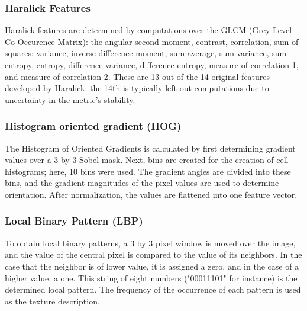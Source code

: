 
\subsubsection{Haralick Features}

Haralick features \cite{Haralick_1973} are determined by computations over the GLCM (Grey-Level Co-Occurence Matrix): the angular second moment, contrast, correlation, sum of squares: variance, inverse difference moment, sum average, sum variance, sum entropy, entropy, difference variance, difference entropy, measure of correlation 1, and measure of correlation 2. These are 13 out of the 14 original features developed by Haralick: the 14th is typically left out computations due to uncertainty in the metric's stability. 

\subsubsection{Histogram oriented gradient (HOG)}

The Histogram of Oriented Gradients is calculated by first determining gradient values over a 3 by 3 Sobel mask. Next, bins are created for the creation of cell histograms; here, 10 bins were used. The gradient angles are divided into these bins, and the gradient magnitudes of the pixel values are used to determine orientation. After normalization, the values are flattened into one feature vector. 

\subsubsection{Local Binary Pattern (LBP)}

To obtain local binary patterns, a 3 by 3 pixel window is moved over the image, and the value of the central pixel is compared to the value of its neighbors. In the case that the neighbor is of lower value, it is assigned a zero, and in the case of a higher value, a one. This string of eight numbers ("00011101" for instance) is the determined local pattern. The frequency of the occurrence of each pattern is used as the texture description. 
  
  

  
  
  
  
  